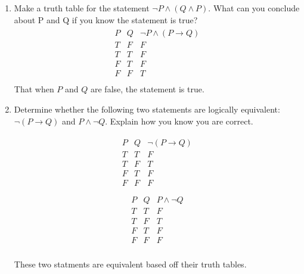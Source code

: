\documentclass[11pt,a4paper]{article}
\newcommand\setItemNumber[1]{\setcounter{enumi}{\numexpr#1-1\relax}}
\begin{document}
\begin{enumerate}
        \setItemNumber{3}
        \item Make a truth table for the statement $\neg P\land(Q\land P)$. What can you conclude about P and Q if you know the statement is true?
        \begin{align*}
            \begin{array}{|c|c|c|}
                P & Q & \neg P\land (P\rightarrow Q)\\
            \hline
            T & F & F\\
            T & T & F\\
            F & T & F\\
            F & F & T\\
            \end{array}
        \end{align*}
        That when $P$ and $Q$ are false, the statement is true.

        \setItemNumber{6}
    \item Determine whether the following two statements are logically equivalent: $\neg(P\rightarrow Q)$ and $P\land\neg Q$. Explain how you know you are correct.

        \begin{align*}
            \begin{array}{|c|c|c|}
                P & Q & \neg (P\rightarrow Q)\\
            \hline
            T & T & F\\
            T & F & T\\
            F & T & F\\
            F & F & F\\
            \end{array}
        \end{align*}
        \begin{align*}
            \begin{array}{|c|c|c|}
                P & Q & P\land\neg Q\\
            \hline
            T & T & F\\
            T & F & T\\
            F & T & F\\
            F & F & F\\
            \end{array}
        \end{align*}

        These two statments are equivalent based off their truth tables.


\end{enumerate}
\end{document}
